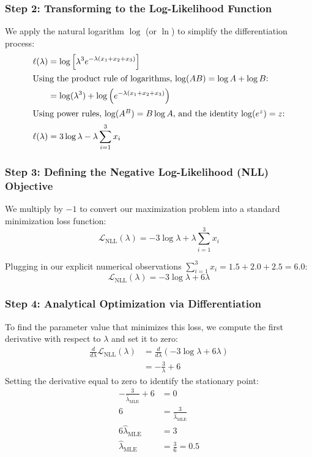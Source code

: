 \documentclass{article}
\begin{document}
\subsubsection{Step 2: Transforming to the Log-Likelihood Function}
We apply the natural logarithm $\log$ (or $\ln$) to simplify the differentiation process:
\begin{align*}
\ell(\lambda) &= \log \left[ \lambda^3 e^{-\lambda (x_1 + x_2 + x_3)} \right] \\
\intertext{Using the product rule of logarithms, $\log(AB) = \log A + \log B$:}
&= \log(\lambda^3) + \log\left(e^{-\lambda (x_1 + x_2 + x_3)}\right) \\
\intertext{Using power rules, $\log(A^B) = B\log A$, and the identity $\log(e^z) = z$:}
\ell(\lambda) &= 3\log\lambda - \lambda \sum_{i=1}^{3} x_i
\end{align*}

\subsubsection{Step 3: Defining the Negative Log-Likelihood (NLL) Objective}
We multiply by $-1$ to convert our maximization problem into a standard minimization loss function:
\begin{equation}
\mathcal{L}_{\text{NLL}}(\lambda) = -3\log\lambda + \lambda \sum_{i=1}^{3} x_i
\end{equation}

Plugging in our explicit numerical observations $\sum_{i=1}^3 x_i = 1.5 + 2.0 + 2.5 = 6.0$:
\begin{equation}
\mathcal{L}_{\text{NLL}}(\lambda) = -3\log\lambda + 6\lambda
\end{equation}

\subsubsection{Step 4: Analytical Optimization via Differentiation}
To find the parameter value that minimizes this loss, we compute the first derivative with respect to $\lambda$ and set it to zero:
\begin{align*}
\frac{d}{d\lambda} \mathcal{L}_{\text{NLL}}(\lambda) &= \frac{d}{d\lambda} (-3\log\lambda + 6\lambda) \\
&= -\frac{3}{\lambda} + 6
\end{align*}
Setting the derivative equal to zero to identify the stationary point:
\begin{align*}
-\frac{3}{\hat{\lambda}_{\text{MLE}}} + 6 &= 0 \\
6 &= \frac{3}{\hat{\lambda}_{\text{MLE}}} \\
6\hat{\lambda}_{\text{MLE}} &= 3 \\
\hat{\lambda}_{\text{MLE}} &= \frac{3}{6} = 0.5
\end{align*}
\end{document}
